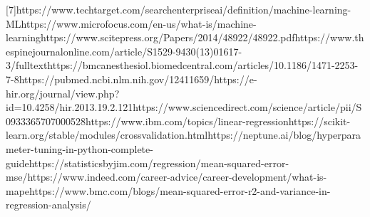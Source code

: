 \documentclass[journal]{IEEEtran} %
\begin{document}
\footnotesize{[7]https://www.techtarget.com/searchenterpriseai/definition/machine-learning-ML\newline
[8] https://www.microfocus.com/en-us/what-is/machine-learning\newline
[9] https://www.scitepress.org/Papers/2014/48922/48922.pdf\newline
[10] https://www.thespinejournalonline.com/article/S1529-9430(13)01617-3/fulltext\newline
[11] https://bmcanesthesiol.biomedcentral.com/articles/10.1186/1471-2253-7-8\newline
[12] https://pubmed.ncbi.nlm.nih.gov/12411659/\newline
[13] https://e-hir.org/journal/view.php?id=10.4258/hir.2013.19.2.121\newline
[14] https://www.sciencedirect.com/science/article/pii/S0933365707000528\newline
[16] https://www.ibm.com/topics/linear-regression\newline
[17] https://scikit-learn.org/stable/modules/cross\textunderscore validation.html\newline
[18] https://neptune.ai/blog/hyperparameter-tuning-in-python-complete-guide\newline
[19] https://statisticsbyjim.com/regression/mean-squared-error-mse/\newline
[20] https://www.indeed.com/career-advice/career-development/what-is-mape\newline
[21] https://www.bmc.com/blogs/mean-squared-error-r2-and-variance-in-regression-analysis/}
\end{document}
